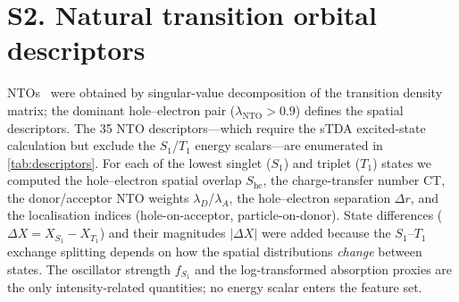 \documentclass[final,3p,times,twocolumn]{elsarticle}
\begin{document}
\section*{S2. Natural transition orbital descriptors}
NTOs~\cite{Martin2003} were obtained by singular-value decomposition of the
transition density matrix; the dominant hole--electron pair
($\lambda_\text{NTO}>0.9$) defines the spatial descriptors. The \num{35}
NTO descriptors---which require the sTDA excited-state calculation but exclude the
$S_1$/$T_1$ energy scalars---are enumerated in \cref{tab:descriptors}. For each of
the lowest singlet ($S_1$) and triplet ($T_1$) states we computed the
hole--electron spatial overlap $S_\text{he}$, the charge-transfer number CT, the
donor/acceptor NTO weights $\lambda_D$/$\lambda_A$, the hole--electron separation
$\Delta r$, and the localisation indices (hole-on-acceptor, particle-on-donor).
State differences ($\Delta X = X_{S_1}-X_{T_1}$) and their magnitudes $|\Delta X|$
were added because the $S_1$--$T_1$ exchange splitting depends on how the spatial
distributions \emph{change} between states. The oscillator strength $f_{S_1}$ and the
log-transformed absorption proxies are the only intensity-related quantities; no
energy scalar enters the feature set.
\end{document}
